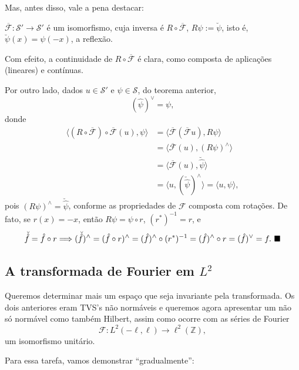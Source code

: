 \documentclass[../distribution_theory_notes.tex]{subfiles}
\begin{document}
Mas, antes disso, vale a pena destacar:

\begin{crl*}
	\(\overline{\mathcal{F}}:\mathcal{S}'\longrightarrow\mathcal{S}'\) é um isomorfismo, cuja inversa é \(R\circ\overline{\mathcal{F}}\), \(R\psi:=\breve\psi\), isto é, \(\breve\psi(x)=\psi(-x)\), a reflexão.
\end{crl*}
\begin{proof*}
	Com efeito, a continuidade de \(R\circ\overline{\mathcal{F}}\) é clara, como composta de aplicações (lineares) e contínuas.

	Por outro lado, dados \(u\in\mathcal{S}'\) e \(\psi\in\mathcal{S}\), do teorema anterior,
	\[
		(\hat\psi)^\vee=\psi,
	\]
	donde
	\begin{align*}
		\bigl\langle (R\circ\overline{\mathcal{F}})\circ\overline{\mathcal{F}}(u),\psi\bigr\rangle
		 & =\bigl\langle \overline{\mathcal{F}}(\overline{\mathcal{F}}u),R\psi\bigr\rangle \\
		 & =\bigl\langle \overline{\mathcal{F}}(u),(R\psi)^\wedge\bigr\rangle              \\
		 & =\bigl\langle \overline{\mathcal{F}}(u),\breve{\hat\psi}\bigr\rangle            \\
		 & =\bigl\langle u,(\breve{\hat\psi})^\wedge\bigr\rangle
		=\langle u,\psi\rangle,
	\end{align*}
	pois \((R\psi)^\wedge=\breve{\hat\psi}\), conforme as propriedades de \(\mathcal{F}\) composta com rotações. De fato, se \(r(x)=-x\), então \(R\psi=\psi\circ r\), \((r^*)^{-1}=r\), e
	\[
		\breve{\hat f}=\hat f\circ r
		\Longrightarrow
		(\breve{\hat f})^\wedge
		=(\hat f\circ r)^\wedge
		=(\hat f)^\wedge\circ(r^*)^{-1}
		=(\hat f)^\wedge\circ r
		=(\hat f)^\vee=f. \text{ $\blacksquare$}
	\]
\end{proof*}

\subsection{A transformada de Fourier em \(L^2\)}

Queremos determinar mais um espaço que seja invariante pela transformada. Os dois anteriores eram TVS's não normáveis e queremos agora apresentar um não só normável como também Hilbert, assim como ocorre com as séries de Fourier
\[
	\mathcal{F}:L^2(-\ell,\ell)\longrightarrow \ell^2(\mathbb{Z}),
\]
um isomorfismo unitário.

Para essa tarefa, vamos demonstrar ``gradualmente'':
\end{document}
